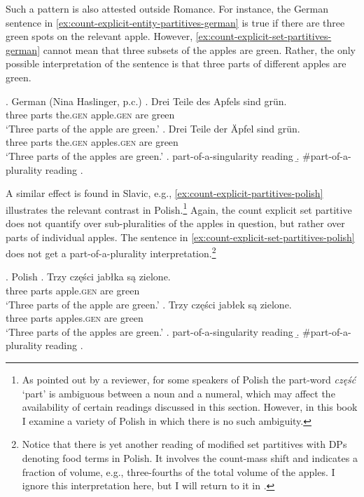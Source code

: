Such a pattern is also attested outside Romance. For instance, the German sentence in \ref{ex:count-explicit-entity-partitives-german} is true if there are three green spots on the relevant apple. However, \ref{ex:count-explicit-set-partitives-german} cannot mean that three subsets of the apples are green. Rather, the only possible interpretation of the sentence is that three parts of different apples are green.

		\ex.\label{ex:count-explicit-partitives-german} German (Nina Haslinger, p.c.)
        \ag. Drei Teile des Apfels sind grün.\label{ex:count-explicit-entity-partitives-german}\\
		three parts the\textsc{.gen} apple\textsc{.gen} are green\\
		`Three parts of the apple are green.'
		\bg. Drei Teile der Äpfel sind grün.\label{ex:count-explicit-set-partitives-german}\\
		three parts the\textsc{.gen} apples\textsc{.gen} are green\\
		`Three parts of the apples are green.'
        \a. part-of-a-singularity reading
        \b. \#part-of-a-plurality reading
        \z.

A similar effect is found in Slavic, e.g., \ref{ex:count-explicit-partitives-polish} illustrates the relevant contrast in Polish.\footnote{As pointed out by a reviewer, for some speakers of Polish the part-word \textit{część} `part' is ambiguous between a noun and a numeral, which may affect the availability of certain readings discussed in this section. However, in this book I examine a variety of Polish in which there is no such ambiguity.} Again, the count explicit set partitive does not quantify over sub-pluralities of the apples in question, but rather over parts of individual apples. The sentence in \ref{ex:count-explicit-set-partitives-polish} does not get a part-of-a-plurality interpretation.\footnote{Notice that there is yet another reading of modified set partitives with DPs denoting food terms in Polish. It involves the count-mass shift and indicates a fraction of volume, e.g., three-fourths of the total volume of the apples. I ignore this interpretation here, but I will return to it in .}

		\ex.\label{ex:count-explicit-partitives-polish} Polish
        \ag. Trzy części jabłka są zielone.\label{ex:count-explicit-entity-partitives-polish}\\
		three parts apple\textsc{.gen} are green\\
		`Three parts of the apple are green.'
		\bg. Trzy części jabłek są zielone.\label{ex:count-explicit-set-partitives-polish}\\
		three parts apples\textsc{.gen} are green\\
		`Three parts of the apples are green.'
        \a. part-of-a-singularity reading
        \b. \#part-of-a-plurality reading
        \z.

